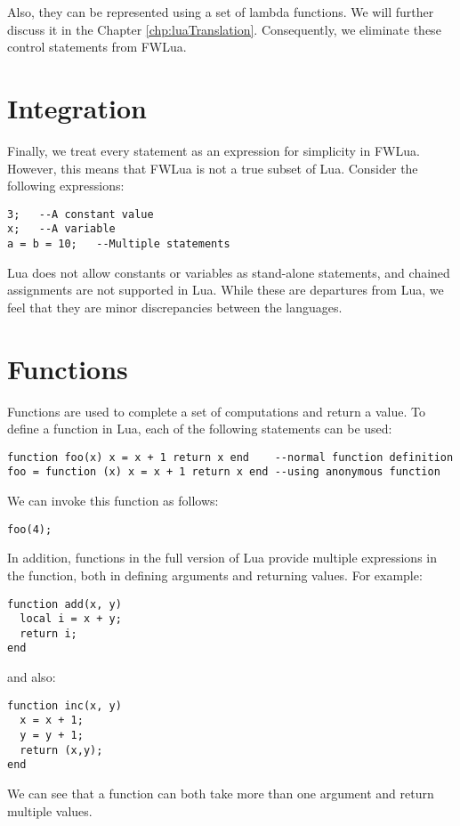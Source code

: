 Also, they can be represented using a set of lambda functions.
We will further discuss it in the Chapter \ref{chp:luaTranslation}.
Consequently, we eliminate these control statements from FWLua.


\section{Integration}
Finally, we treat every statement as an expression for simplicity in FWLua.
However, this means that FWLua is not a true subset of Lua.
Consider the following expressions:

\begin{verbatim}
3;   --A constant value
x;   --A variable
a = b = 10;   --Multiple statements
\end{verbatim}

Lua does not allow constants or variables as stand-alone statements,
and chained assignments are not supported in Lua.
While these are departures from Lua, we feel that they are minor discrepancies between the languages.



\section{Functions}
Functions are used to complete a set of computations and return a value.
To define a function in Lua, each of the following statements can be used:
\begin{verbatim}
function foo(x) x = x + 1 return x end    --normal function definition
foo = function (x) x = x + 1 return x end --using anonymous function
\end{verbatim}
We can invoke this function as follows:
\begin{verbatim}
foo(4);
\end{verbatim}
In addition, functions in the full version of Lua provide multiple expressions in the function, both in defining arguments and returning values. For example:
\begin{verbatim}
function add(x, y)
  local i = x + y;
  return i;
end
\end{verbatim}
and also:
\begin{verbatim}
function inc(x, y)
  x = x + 1;
  y = y + 1;
  return (x,y);
end
\end{verbatim}
We can see that a function can both take more than one argument and return multiple values.

